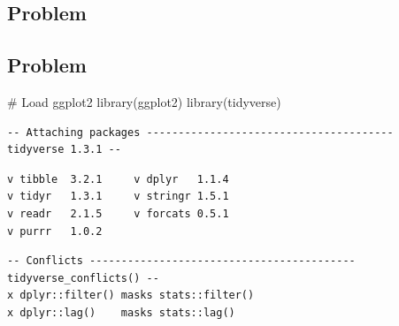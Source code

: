 \documentclass[
  letterpaper,
  DIV=11,
  numbers=noendperiod]{scrartcl}
\newenvironment{Shaded}{\begin{snugshade}}{\end{snugshade}}
\newcommand{\CommentTok}[1]{\textcolor[rgb]{0.37,0.37,0.37}{#1}}
\newcommand{\FunctionTok}[1]{\textcolor[rgb]{0.28,0.35,0.67}{#1}}
\newcommand{\NormalTok}[1]{\textcolor[rgb]{0.00,0.23,0.31}{#1}}
\begin{document}
\subsection{Problem}\label{problem-2}

\subsection{Problem}\label{problem-3}

\begin{Shaded}
\begin{Highlighting}[]
\CommentTok{\# Load ggplot2}
\FunctionTok{library}\NormalTok{(ggplot2)}
\FunctionTok{library}\NormalTok{(tidyverse)}
\end{Highlighting}
\end{Shaded}

\begin{verbatim}
-- Attaching packages --------------------------------------- tidyverse 1.3.1 --
\end{verbatim}

\begin{verbatim}
v tibble  3.2.1     v dplyr   1.1.4
v tidyr   1.3.1     v stringr 1.5.1
v readr   2.1.5     v forcats 0.5.1
v purrr   1.0.2     
\end{verbatim}

\begin{verbatim}
-- Conflicts ------------------------------------------ tidyverse_conflicts() --
x dplyr::filter() masks stats::filter()
x dplyr::lag()    masks stats::lag()
\end{verbatim}
\end{document}
